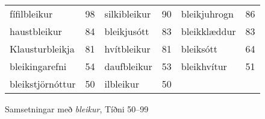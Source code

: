\documentclass[../samsetningasafn.tex]{subfiles}
\begin{document}
\begin{wordlist}[H]
\begin{tcolorbox}

	\setlength{\extrarowheight}{3pt}
	\begin{tabular}{BlBlBl}
		fífilbleikur		& 98		&  
		silkibleikur		& 90		& 
		bleikjuhrogn		& 86		\\ 
		haustbleikur		& 84		& 
		bleikjusótt		& 83		& 	
		bleikklæddur		& 83		\\ 		
		Klausturbleikja	& 81		& 		
		hvítbleikur		& 81		& 	
		bleiksótt			& 64		\\ 	
		bleikingarefni		& 54		& 	
		daufbleikur		& 53		& 	
		bleikhvítur		& 51		\\ 	
		bleikstjörnóttur	& 50		& 	
		ilbleikur			& 50		& 		
						&
	\end{tabular}

\end{tcolorbox}
	\caption{Samsetningar með \textit{bleikur}, Tíðni 50--99}
	\label{listi:bleikt.50}
\end{wordlist}
\end{document}
